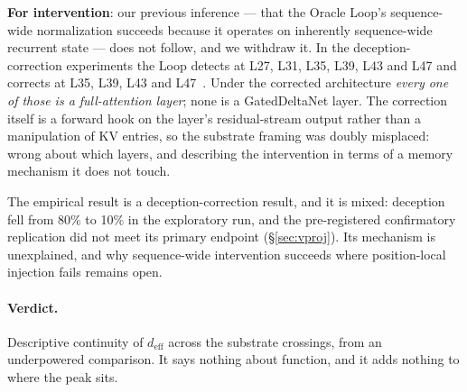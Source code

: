 \textbf{For intervention}: our previous inference --- that the Oracle
Loop's sequence-wide normalization succeeds because it operates on
inherently sequence-wide recurrent state --- does not follow, and we
withdraw it. In the deception-correction experiments the Loop detects
at L27, L31, L35, L39, L43 and L47 and corrects at L35, L39, L43 and
L47~\citep{cc2026targeted}. Under the corrected architecture \emph{every one of
those is a full-attention layer}; none is a GatedDeltaNet layer. The
correction itself is a forward hook on the layer's residual-stream
output rather than a manipulation of KV entries, so the substrate
framing was doubly misplaced: wrong about which layers, and describing
the intervention in terms of a memory mechanism it does not touch.

The empirical result is a deception-correction result, and it is
mixed: deception fell from 80\% to 10\% in the exploratory run, and
the pre-registered confirmatory replication did not meet its primary
endpoint (\S\ref{sec:vproj}). Its mechanism is unexplained, and why
sequence-wide intervention succeeds where position-local injection
fails remains open.

\paragraph{Verdict.} Descriptive continuity of $d_\text{eff}$ across the
substrate crossings, from an underpowered comparison. It says nothing
about function, and it adds nothing to where the peak sits.
